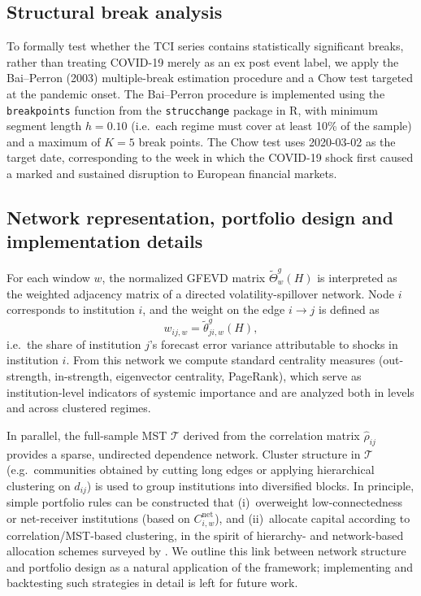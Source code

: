 \subsection{Structural break analysis}\label{subsec:breaks}

To formally test whether the TCI series contains statistically significant breaks, rather than treating COVID-19 merely as an ex post event label, we apply the
Bai--Perron (2003) multiple-break estimation procedure and a Chow test targeted at the
pandemic onset. The Bai--Perron procedure is implemented using the \texttt{breakpoints}
function from the \texttt{strucchange} package in \textsf{R}, with minimum segment
length $h = 0.10$ (i.e.\ each regime must cover at least 10\% of the sample) and a
maximum of $K = 5$ break points. The Chow test uses 2020-03-02 as the target date,
corresponding to the week in which the COVID-19 shock first caused a marked and
sustained disruption to European financial markets.

\subsection{Network representation, portfolio design and implementation
details}\label{subsec:implementation}

For each window $w$, the normalized GFEVD matrix $\tilde{\Theta}^g_w(H)$ is interpreted
as the weighted adjacency matrix of a directed volatility-spillover network. Node $i$
corresponds to institution $i$, and the weight on the edge $i \rightarrow j$ is defined
as
\[
  w_{ij,w} = \tilde{\theta}_{ji,w}^g(H),
\]
i.e.\ the share of institution $j$'s forecast error variance attributable to shocks in
institution $i$. From this network we compute standard centrality measures (out-strength,
in-strength, eigenvector centrality, PageRank), which serve as institution-level
indicators of systemic importance and are analyzed both in levels and across clustered
regimes.

In parallel, the full-sample MST $\mathcal{T}$ derived from the correlation matrix
$\hat{\rho}_{ij}$ provides a sparse, undirected dependence network. Cluster structure in
$\mathcal{T}$ (e.g.\ communities obtained by cutting long edges or applying hierarchical
clustering on $d_{ij}$) is used to group institutions into diversified blocks. In
principle, simple portfolio rules can be constructed that (i)~overweight
low-connectedness or net-receiver institutions (based on $C_{i,w}^{\text{net}}$), and
(ii)~allocate capital according to correlation/MST-based clustering, in the spirit of
hierarchy- and network-based allocation schemes surveyed by \citet{MartiEtAl2020}. We
outline this link between network structure and portfolio design as a natural application
of the framework; implementing and backtesting such strategies in detail is left for
future work.

